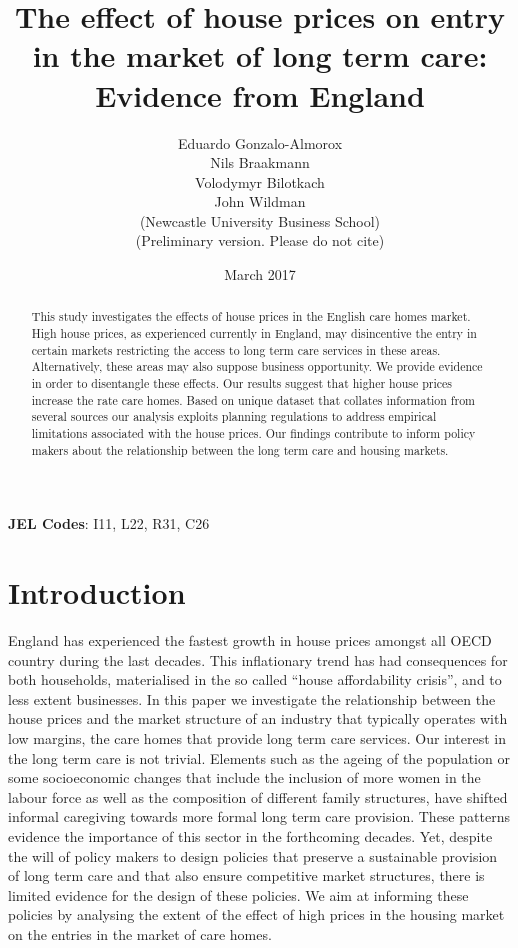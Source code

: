 \documentclass[11pt,a4paper,]{article}
\title{The effect of house prices on entry in the market of long term care:
Evidence from England}
\author{Eduardo Gonzalo-Almorox \\ Nils Braakmann \\ Volodymyr Bilotkach \\ John Wildman \\ (Newcastle University Business School) \\ (Preliminary version. Please do not cite)}
\date{March 2017}
\begin{document}
\maketitle

\begin{abstract}

This study investigates the effects of house prices in the English care homes market. High house prices, as experienced currently in England, may disincentive the entry in certain markets restricting the access to long term care services in these areas. Alternatively, these areas may also suppose business opportunity. We provide evidence in order to disentangle these effects. Our results suggest that higher house prices increase the rate care homes. Based on unique dataset that collates information from several sources our analysis exploits planning regulations to address empirical limitations associated with the house prices. Our findings contribute to inform policy makers about the relationship between the long term care and housing markets. 

 
\end{abstract}

\textbf{JEL Codes}: I11, L22, R31, C26

\newpage

\section{Introduction}\label{introduction}

England has experienced the fastest growth in house prices amongst all
OECD country during the last decades. This inflationary trend has had
consequences for both households, materialised in the so called ``house
affordability crisis'', and to less extent businesses. In this paper we
investigate the relationship between the house prices and the market
structure of an industry that typically operates with low margins, the
care homes that provide long term care services. Our interest in the
long term care is not trivial. Elements such as the ageing of the
population or some socioeconomic changes that include the inclusion of
more women in the labour force as well as the composition of different
family structures, have shifted informal caregiving towards more formal
long term care provision. These patterns evidence the importance of this
sector in the forthcoming decades. Yet, despite the will of policy
makers to design policies that preserve a sustainable provision of long
term care and that also ensure competitive market structures, there is
limited evidence for the design of these policies. We aim at informing
these policies by analysing the extent of the effect of high prices in
the housing market on the entries in the market of care homes.
\end{document}
